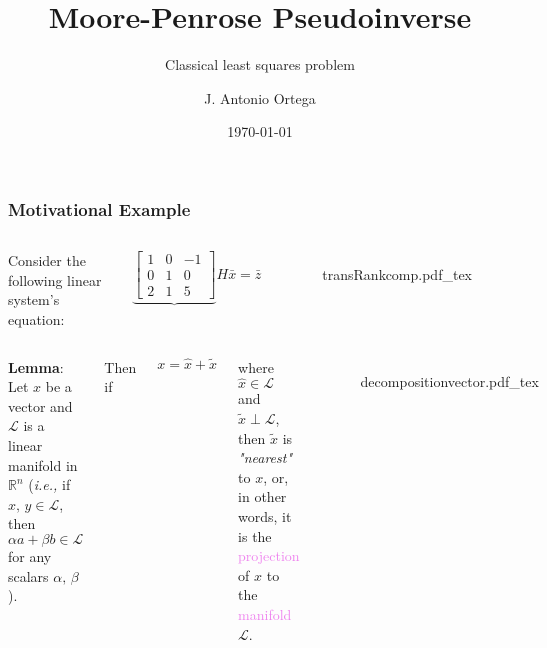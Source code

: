 \documentclass[aspectratio=169]{beamer}
\title[Penrose Pseudoinverse]{Moore-Penrose Pseudoinverse}
\subtitle{Classical least squares problem}
\author{J. Antonio Ortega}
\institute{UNAM}
\date{\today}
\newcommand{\incfig}[2][1]{%
    \def\svgwidth{#1\columnwidth}
    {#2.pdf_tex} }
\begin{document}

\frame{\titlepage}

\begin{frame}
	\frametitle{Motivational Example}
	
	\begin{columns}

		
	Consider the following linear system's equation:

	\begin{equation*}
		\underbrace{\begin{bmatrix}
			1 & 0 & -1 \\ 0 & 1 & 0 \\ 2 & 1 & 5
		\end{bmatrix}}{H} \bar{x} =  \bar{z}
	\end{equation*}

	
\begin{figure}[ht]
    \centering
    \incfig{transRankcomp}
    \label{fig:transRankcomp}
\end{figure}

	\end{columns}

\end{frame}

\begin{frame} %

\begin{columns}

		
{\color{violet} \textbf{Lemma}:} Let $x$ be a vector and $\mathcal{L}$ is a linear manifold in $\mathbb{R}^n$
(\textit{i.e., } if $x, \, y \in \mathcal{L}$, then $\alpha a + \beta b \in \mathcal{L}$ for any scalars $\alpha, \, \beta$).

Then if

\[ x = \hat{x} + \tilde{x} \]

\noindent where $\hat{x} \in \mathcal{L}$ and $\tilde{x} \perp \mathcal{L}$,
then $\tilde{x}$ is \textit{"nearest"} to $x$, or, in other words, it is the \textcolor{violet}{projection}
of $x$ to the \textcolor{violet}{manifold} $\mathcal{L}$.
		

\begin{figure}[ht]
    \centering
    \incfig{decompositionvector}
    \label{fig:decompositionvector}
\end{figure}

\end{columns}
	
\end{frame}
\end{document}
